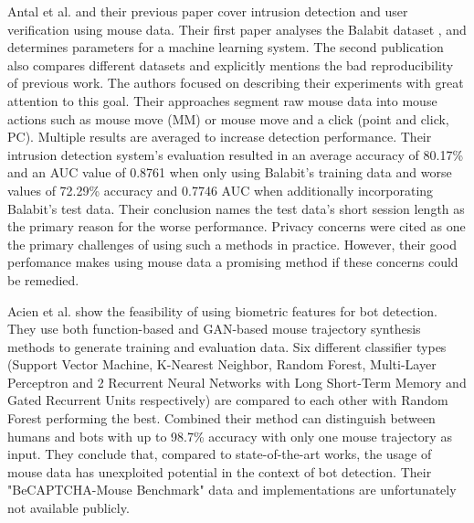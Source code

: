 \documentclass[
    fontsize=12pt,
    headings=small,
    parskip=half,           %
    bibliography=totoc,
    numbers=noenddot,       %
    open=any,               %
    final,                   %
    table
]{scrreprt}
\begin{document}
Antal et al.\cite{9111596} and their previous paper \cite{https://doi.org/10.1049/iet-bmt.2018.5126} cover intrusion detection and user verification using mouse data. Their first paper analyses the Balabit dataset \cite{BALABIT_CHALLENGE}, and determines parameters for a machine learning system. The second publication also compares different datasets and explicitly mentions the bad reproducibility of previous work. The authors focused on describing their experiments with great attention to this goal. Their approaches segment raw mouse data into mouse actions such as mouse move (MM) or mouse move and a click (point and click, PC). Multiple results are averaged to increase detection performance. Their intrusion detection system's evaluation resulted in an average accuracy of 80.17\% and an AUC value of 0.8761 when only using Balabit's training data and worse values of 72.29\% accuracy and 0.7746 AUC when additionally incorporating Balabit's test data. Their conclusion names the test data's short session length as the primary reason for the worse performance. Privacy concerns were cited as one the primary challenges of using such a methods in practice. However, their good perfomance makes using mouse data a promising method if these concerns could be remedied.

Acien et al. \cite{Acien2020BeCAPTCHAMouseSM} show the feasibility of using biometric features for bot detection. They use both function-based and GAN-based mouse trajectory synthesis methods to generate training and evaluation data. Six different classifier types (Support Vector Machine, K-Nearest Neighbor, Random Forest, Multi-Layer Perceptron and 2 Recurrent Neural Networks with Long Short-Term Memory and Gated Recurrent Units respectively) are compared to each other with Random Forest performing the best. Combined their method can distinguish between humans and bots with up to 98.7\% accuracy with only one mouse trajectory as input. They conclude that, compared to state-of-the-art works, the usage of mouse data has unexploited potential in the context of bot detection. Their "BeCAPTCHA-Mouse Benchmark" data and implementations are unfortunately not available publicly.
\end{document}
